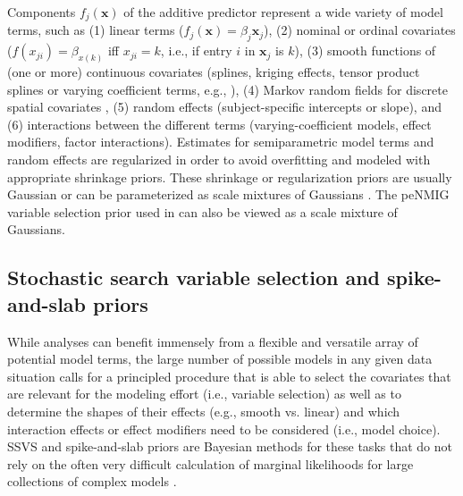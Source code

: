 \documentclass[article, shortnames, nojss, noheadings, notitle]{jss}
\begin{document}
Components $f_j(\bm x)$ of the additive predictor represent a wide variety of model terms, such as
(1) linear terms ($f_j(\bm x) = \beta_j \bm x_j$),
(2) nominal or ordinal covariates ($f(x_{ji}) = \beta_{x(k)}$ iff $x_{ji} = k$, i.e., if entry $i$ in $\bm x_j$ is $k$),
(3) smooth functions of (one or more) continuous covariates (splines, kriging effects, tensor product splines or varying coefficient terms, e.g., \citet{Wood:2006}),
(4) Markov random fields for discrete spatial covariates \citep[e.g.][]{Rue:Held:2005},
(5) random effects (subject-specific intercepts or slope), and (6) interactions between the different terms (varying-coefficient models, effect modifiers, factor interactions).
Estimates for semiparametric model terms and random effects are regularized in order to
avoid overfitting and modeled with appropriate shrinkage priors.
These shrinkage or regularization priors are usually Gaussian or can
be parameterized as scale mixtures of Gaussians \citep[e.g.][]{Fahr:Kneib:Konrath:2010}.
The peNMIG variable selection prior used in  can also be viewed as a scale mixture of Gaussians.

\newpage
\subsection{Stochastic search variable selection and spike-and-slab priors}\label{spikeSlabSSVS}%
While analyses can benefit immensely from a flexible and versatile array of potential model terms,
the large number of possible models in any given data situation calls for a principled procedure
that is able to select the covariates that
are relevant for the modeling effort (i.e., variable selection) as well as to determine
the shapes of their effects (e.g., smooth vs. linear) and which interaction effects or effect modifiers
need to be considered (i.e., model choice). SSVS and spike-and-slab priors are Bayesian methods
for these tasks that do not rely on the often very difficult calculation of marginal likelihoods for
large collections of complex models \citep[e.g.][]{Han:Carlin:2001}.
\end{document}
